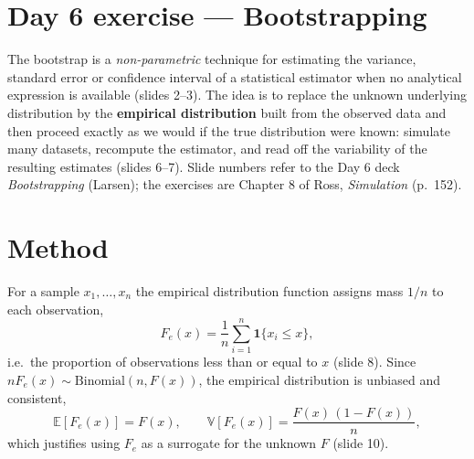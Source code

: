 \newpage
\section*{Day 6 exercise --- Bootstrapping}

The bootstrap is a \emph{non-parametric} technique for estimating the variance,
standard error or confidence interval of a statistical estimator when no
analytical expression is available (slides 2--3). The idea is to replace the
unknown underlying distribution by the \textbf{empirical distribution} built
from the observed data and then proceed exactly as we would if the true
distribution were known: simulate many datasets, recompute the estimator, and
read off the variability of the resulting estimates (slides 6--7). Slide
numbers refer to the Day 6 deck \emph{Bootstrapping} (Larsen); the exercises
are Chapter 8 of Ross, \emph{Simulation} (p.\ 152).

\section*{Method}

For a sample $x_1,\dots,x_n$ the empirical distribution function assigns mass
$1/n$ to each observation,
\begin{equation}
    F_e(x) = \frac{1}{n}\sum_{i=1}^{n} \mathbf{1}\{x_i \le x\},
    \label{eq:edf}
\end{equation}
i.e.\ the proportion of observations less than or equal to $x$ (slide 8). Since
$nF_e(x)\sim\mathrm{Binomial}(n,F(x))$, the empirical distribution is unbiased
and consistent,
\begin{equation}
    \mathbb{E}[F_e(x)] = F(x), \qquad
    \mathbb{V}[F_e(x)] = \frac{F(x)\,(1-F(x))}{n},
    \label{eq:edf-moments}
\end{equation}
which justifies using $F_e$ as a surrogate for the unknown $F$ (slide 10).

